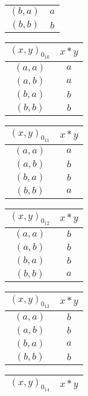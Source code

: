 \documentclass[nohyper,nobib]{tufte-handout}
\theoremstyle{definition}
\theoremstyle{remark}
\begin{document}
\begin{enumerate}
\begin{table}[ht!]
\begin{tabular}{@{}c|c@{}}
                $(b, a)$ & $a$ \\
                $(b, b)$ & $b$
            \end{tabular}
            \qquad
            \begin{tabular}{@{}c|c@{}}
                $(x, y)_{0_{10}}$ & $x * y$ \\
                \midrule
                $(a, a)$ & $a$ \\
                $(a, b)$ & $a$ \\
                $(b, a)$ & $b$ \\
                $(b, b)$ & $b$
            \end{tabular}
            \qquad
            \begin{tabular}{@{}c|c@{}}
                $(x, y)_{0_{11}}$ & $x * y$ \\
                \midrule
                $(a, a)$ & $a$ \\
                $(a, b)$ & $b$ \\
                $(b, a)$ & $b$ \\
                $(b, b)$ & $a$
            \end{tabular}
            \qquad
            \begin{tabular}{@{}c|c@{}}
                $(x, y)_{0_{12}}$ & $x * y$ \\
                \midrule
                $(a, a)$ & $b$ \\
                $(a, b)$ & $b$ \\
                $(b, a)$ & $b$ \\
                $(b, b)$ & $a$
            \end{tabular}
        \end{table}
        \begin{table}[ht!]
            \begin{tabular}{@{}c|c@{}}
                $(x, y)_{0_{13}}$ & $x * y$ \\
                \midrule
                $(a, a)$ & $b$ \\
                $(a, b)$ & $b$ \\
                $(b, a)$ & $a$ \\
                $(b, b)$ & $b$
            \end{tabular}
            \qquad
            \begin{tabular}{@{}c|c@{}}
                $(x, y)_{0_{14}}$ & $x * y$ \\
                \midrule

\end{tabular}
\end{table}
\end{enumerate}
\end{document}
